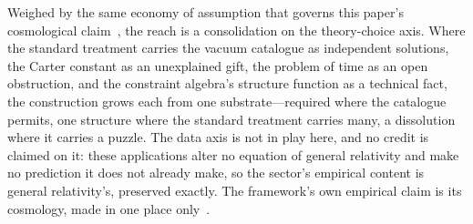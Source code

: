 \documentclass[11pt,a4paper]{article}
\theoremstyle{plain}
\theoremstyle{definition}
\theoremstyle{remark}
\begin{document}
Weighed by the same economy of assumption that governs this paper's cosmological claim~\cite{JanzenShadowExistence}, the reach is a consolidation on the theory-choice axis. Where the standard treatment carries the vacuum catalogue as independent solutions, the Carter constant as an unexplained gift, the problem of time as an open obstruction, and the constraint algebra's structure function as a technical fact, the construction grows each from one substrate---required where the catalogue permits, one structure where the standard treatment carries many, a dissolution where it carries a puzzle. The data axis is not in play here, and no credit is claimed on it: these applications alter no equation of general relativity and make no prediction it does not already make, so the sector's empirical content is general relativity's, preserved exactly. The framework's own empirical claim is its cosmology, made in one place only~\cite{JanzenCRcosmology}.
\end{document}
